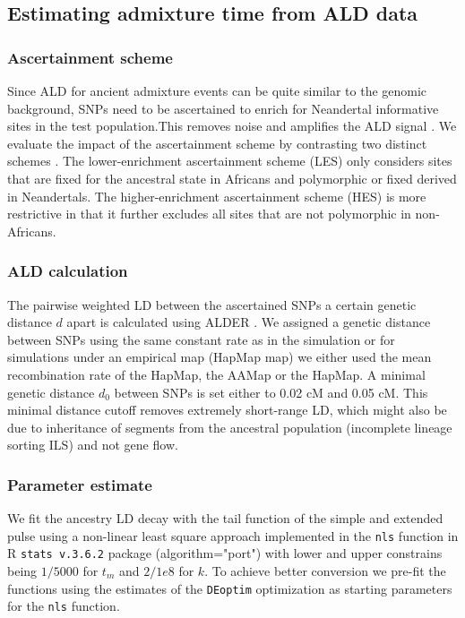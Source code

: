 \documentclass[11pt]{article}
\begin{document}
\subsection{Estimating admixture time from ALD data}\label{Estimating admixture time from ALD data}

\subsubsection{Ascertainment scheme}\label{asceteinment scheme}
Since ALD for ancient admixture events can be quite similar to the genomic background, SNPs need to be ascertained to enrich for
Neandertal informative sites in the test population.This removes noise and
amplifies the ALD signal \citep{sankararaman_date_2012}. 
We evaluate the impact of the ascertainment scheme by contrasting two distinct schemes \citep{sankararaman_date_2012,fu_genome_2014}. The lower-enrichment ascertainment scheme (LES) only considers  sites that are fixed for the ancestral state in
Africans and polymorphic or fixed derived in Neandertals. The higher-enrichment
ascertainment scheme (HES) is more restrictive in that it further excludes all sites that are not polymorphic in non-Africans.

\subsubsection{ALD calculation}\label{ALD calculation}

The pairwise weighted LD between the ascertained SNPs a certain genetic
distance \(d\) apart is calculated using ALDER
\citep{loh_inferring_2013}. We assigned a genetic distance between SNPs using the same constant rate as in the simulation or for simulations under an empirical map (HapMap map) we either used the mean recombination rate of the HapMap, the AAMap or the HapMap. A minimal genetic distance \(d_0\) between
SNPs is set either to 0.02 cM and 0.05 cM. This minimal distance cutoff
removes extremely short-range LD, which might also be due to inheritance of segments from the ancestral population (incomplete lineage sorting ILS) and not gene flow. 

\subsubsection{Parameter estimate}\label{Parameter estimate}

We fit the ancestry LD decay with the tail function of the simple and extended pulse using a non-linear least square approach implemented in the  \texttt{nls} function in  R \texttt{stats v.3.6.2} package (algorithm="port") with lower and upper constrains being $1/5000$ for $t_m$ and $2/1e8$ for $k$. To achieve better conversion we pre-fit the functions using the estimates of the \texttt{DEoptim} optimization  \citep{ardia_deoptim_2016} as starting parameters for the \texttt{nls} function.
\end{document}
